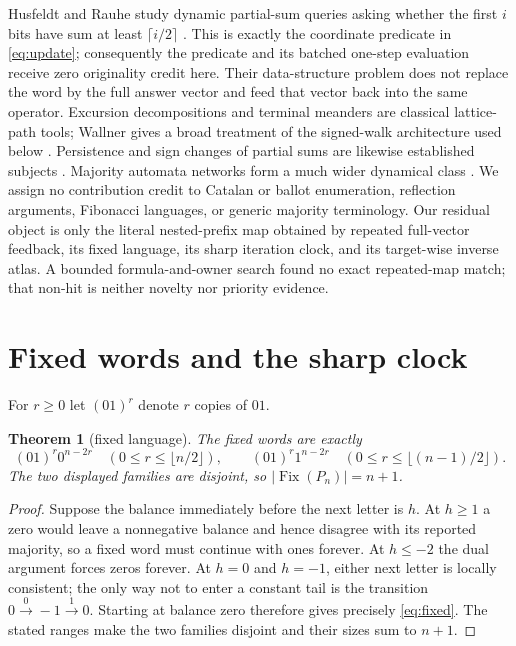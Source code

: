 \documentclass[10pt,a4paper]{amsart}
\newtheorem{theorem}{Theorem}[section]
\theoremstyle{definition}
\theoremstyle{remark}
\newcommand{\Fix}{\operatorname{Fix}}
\begin{document}
Husfeldt and Rauhe study dynamic partial-sum queries asking whether the first
$i$ bits have sum at least $\lceil i/2\rceil$ \cite{HusfeldtRauhe2003}.
This is exactly the coordinate predicate in \eqref{eq:update}; consequently
the predicate and its batched one-step evaluation receive zero originality
credit here.  Their data-structure problem does not replace the word by the
full answer vector and feed that vector back into the same operator.
Excursion decompositions and terminal meanders are classical lattice-path
tools; Wallner gives a broad treatment of the signed-walk architecture used
below \cite{Wallner2016}.  Persistence and sign changes of partial sums are
likewise established subjects \cite{SparreAndersen1954,ErdosHunt1953}.
Majority automata networks form a much wider dynamical class
\cite{GolesEtAl2016}.  We assign no contribution credit to Catalan or ballot
enumeration, reflection arguments, Fibonacci languages, or generic majority
terminology.  Our residual object is only the literal nested-prefix map
obtained by repeated full-vector feedback, its fixed language, its sharp
iteration clock, and its target-wise inverse atlas.  A bounded
formula-and-owner search found no exact repeated-map match; that non-hit is
neither novelty nor priority evidence.

\section{Fixed words and the sharp clock}

For $r\ge0$ let $(01)^r$ denote $r$ copies of $01$.

\begin{theorem}[fixed language]\label{thm:fixed}
The fixed words are exactly
\begin{equation}
 (01)^r0^{n-2r}\quad(0\le r\le\lfloor n/2\rfloor),
 \qquad
 (01)^r1^{n-2r}\quad(0\le r\le\lfloor(n-1)/2\rfloor). \label{eq:fixed}
\end{equation}
The two displayed families are disjoint, so $|\Fix(P_n)|=n+1$.
\end{theorem}

\begin{proof}
Suppose the balance immediately before the next letter is $h$.  At $h\ge1$
a zero would leave a nonnegative balance and hence disagree with its reported
majority, so a fixed word must continue with ones forever.  At $h\le-2$ the
dual argument forces zeros forever.  At $h=0$ and $h=-1$, either next letter
is locally consistent; the only way not to enter a constant tail is the
transition $0\xrightarrow{0}-1\xrightarrow{1}0$.  Starting at balance zero
therefore gives precisely \eqref{eq:fixed}.  The stated ranges make the two
families disjoint and their sizes sum to $n+1$.
\end{proof}
\end{document}
